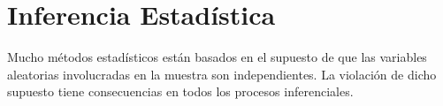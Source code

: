 \section{Inferencia Estadística}

Mucho métodos estadísticos están basados en el supuesto de que las variables aleatorias involucradas en la muestra son independientes. La violación de dicho supuesto tiene consecuencias en todos los procesos inferenciales. 